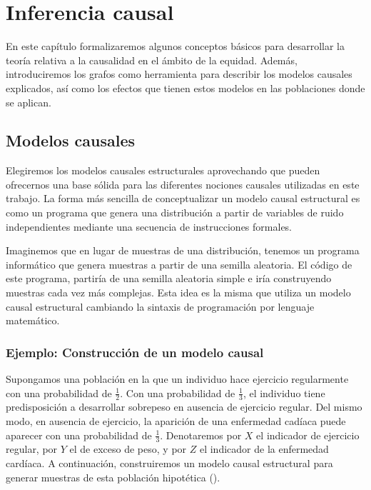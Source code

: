 \documentclass[oneside,openright,titlepage,numbers=noenddot,openany,headinclude,footinclude=true,
cleardoublepage=empty,abstractoff,BCOR=5mm,paper=a4,fontsize=12pt,main=spanish]{scrreprt}
\begin{document}
\chapter{Inferencia causal}

En este capítulo formalizaremos algunos conceptos básicos para desarrollar la teoría relativa a la causalidad en el ámbito de la equidad. Además, introduciremos los grafos como herramienta para describir los modelos causales explicados, así como los efectos que tienen estos modelos en las poblaciones donde se aplican.

\section{Modelos causales}

Elegiremos los modelos causales estructurales aprovechando que pueden ofrecernos una base sólida para las diferentes nociones causales utilizadas en este trabajo. La forma más sencilla de conceptualizar un modelo causal estructural es como un programa que genera una distribución a partir de variables de ruido independientes mediante una secuencia de instrucciones formales. 

Imaginemos que en lugar de muestras de una distribución, tenemos un programa informático que genera muestras a partir de una semilla aleatoria. El código de este programa, partiría de una semilla aleatoria simple e iría construyendo muestras cada vez más complejas. Esta idea es la misma que utiliza un modelo causal estructural cambiando la sintaxis de programación por lenguaje matemático.

\subsection{Ejemplo: Construcción de un modelo causal}

\label{subsec:sobrepeso}

Supongamos una población en la que un individuo hace ejercicio regularmente con una probabilidad de $\frac{1}{2}$. Con una probabilidad de $\frac{1}{3}$, el individuo tiene predisposición a desarrollar sobrepeso en ausencia de ejercicio regular. Del mismo modo, en ausencia de ejercicio, la aparición de una enfermedad cadíaca puede aparecer con una probabilidad de $\frac{1}{3}$. Denotaremos por $X$ el indicador de ejercicio regular, por $Y$ el de exceso de peso, y por $Z$ el indicador de la enfermedad cardíaca. A continuación, construiremos un modelo causal estructural para generar muestras de esta población hipotética (\cite{fairnesslearning2019}).
\end{document}

